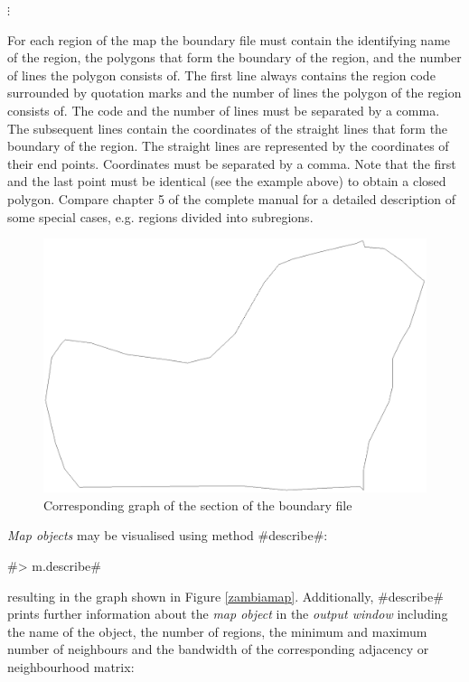 \documentclass{article}
\begin{document}
\hspace{1cm} $\vdots$

\normalsize

\vspace{0.3cm}

For each region of the map the boundary file must contain the
identifying name of the region, the polygons that form the
boundary of the region, and the number of lines the polygon
consists of. The first line always contains the region code
surrounded by quotation marks and the number of lines the polygon
of the region consists of. The code and the number of lines must
be separated by a comma. The subsequent lines contain the
coordinates of the straight lines that form the boundary of the
region. The straight lines are represented by the coordinates of
their end points. Coordinates must be separated by a comma. Note
that the first and the last point must be identical (see the
example above) to obtain a closed polygon. Compare chapter 5 of
the complete manual for a detailed description of some special
cases, e.g. regions divided into subregions.

\begin{figure}[h]
\centering
\includegraphics [scale=0.3]{grafiken/zambia52.ps}
\caption{\label{zambia52} Corresponding graph of the section of
the boundary file}
\end{figure}

{\it Map objects} may be visualised using method #describe#:

#> m.describe#

resulting in the graph shown in Figure \ref{zambiamap}.
Additionally, #describe# prints further information about the {\it
map object} in the {\it output window} including the name of the
object, the number of regions, the minimum and maximum number of
neighbours and the bandwidth of the corresponding adjacency or
neighbourhood matrix:
\end{document}
